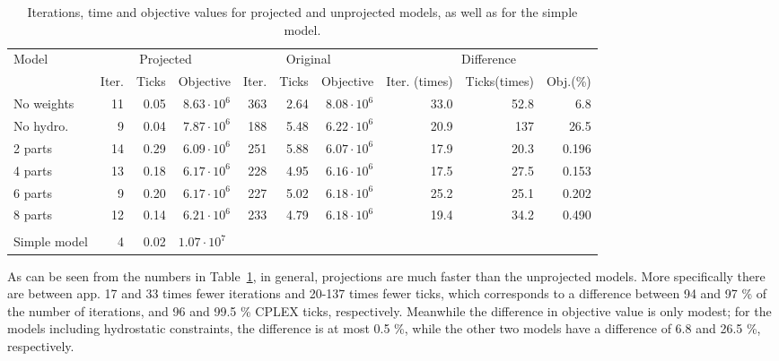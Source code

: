 \begin{table}[htbp]
\centering
\begin{tabular}{l|rrr|rrr|rrr}
\toprule
Model&\multicolumn{3}{c|}{Projected}&\multicolumn{3}{c|}{Original}&\multicolumn{3}{c}{Difference}\\
&Iter.&Ticks&Objective&Iter.&Ticks&Objective&Iter. (times)&Ticks(times)&Obj.(\%)\\ 
\midrule
No weights&	11 & 0.05 & $8.63\cdot 10^6$ &	363 & 2.64&$8.08\cdot 10^6$
&33.0&52.8&6.8\\
\midrule
{No hydro.}& 9 & 0.04 &$7.87\cdot 10^6$&	188 & 5.48&$6.22 \cdot 10^6$
&20.9&137&26.5\\
\midrule
{2 parts}& 14 & 0.29 & $6.09\cdot 10^6$ &	251 & 5.88&$6.07\cdot 10^6$
&17.9&20.3&0.196\\
\midrule
{4 parts} &13 & 0.18 &$6.17\cdot 10^6$ & 228 & 4.95 &$6.16\cdot 10^6$
&17.5&27.5&0.153\\
\midrule
{6 parts} &9 & 0.20& $6.17\cdot 10^6$ &227 & 5.02 &$6.18\cdot 10^6$
&25.2&25.1&0.202\\
\midrule
{8 parts} &12 & 0.14& $6.21\cdot 10^6$ & 233 & 4.79 &$6.18\cdot 10^6$
&19.4&34.2&0.490\\
\bottomrule
\multicolumn{10}{c}{}\\
\cmidrule{1-4}
Simple model & 4 & 0.02 &\multicolumn{2}{l}{$1.07\cdot 10^7$}\\
\cmidrule{1-4}
\end{tabular}
\caption{Iterations, time and objective values for projected and unprojected models, as well as for the simple model. }
\label{tab:usingProjections}
\end{table}
As can be seen from the numbers in Table~\ref{tab:usingProjections}, in general, projections are much faster than the unprojected models. More specifically there are between app. 17 and 33 times fewer iterations and 20-137 times fewer ticks, which corresponds to a difference between 94 and 97 \% of the number of iterations, and 96 and 99.5 \% CPLEX ticks, respectively. 
Meanwhile the difference in objective value is only modest; for the models including hydrostatic constraints, the difference is at most 0.5 \%, while the other two models have a difference of 6.8 and 26.5 \%, respectively. 

